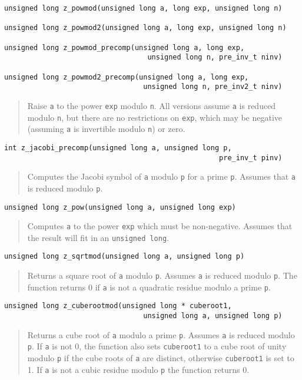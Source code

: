 \documentclass[a4paper,10pt]{article}
\newcommand{\code}{\lstinline}
\begin{document}
\begin{lstlisting}
unsigned long z_powmod(unsigned long a, long exp, unsigned long n)

unsigned long z_powmod2(unsigned long a, long exp, unsigned long n)

unsigned long z_powmod_precomp(unsigned long a, long exp, 
                                  unsigned long n, pre_inv_t ninv)
                                     
unsigned long z_powmod2_precomp(unsigned long a, long exp, 
                                 unsigned long n, pre_inv2_t ninv)
\end{lstlisting}
\begin{quote}
Raise \code{a} to the power \code{exp} modulo \code{n}. All versions assume \code{a} is reduced modulo \code{n}, but there are no restrictions on \code{exp}, which may be negative (assuming \code{a} is invertible modulo \code{n}) or zero. 
\end{quote}                              

\begin{lstlisting}
int z_jacobi_precomp(unsigned long a, unsigned long p, 
                                                   pre_inv_t pinv)
\end{lstlisting}
\begin{quote}
Computes the Jacobi symbol of \code{a} modulo \code{p} for a prime \code{p}. Assumes that \code{a} is reduced modulo \code{p}.
\end{quote}

\begin{lstlisting}
unsigned long z_pow(unsigned long a, unsigned long exp)
\end{lstlisting}
\begin{quote}
Computes \code{a} to the power \code{exp} which must be non-negative. Assumes that the result will fit in an \code{unsigned long}.
\end{quote}

\begin{lstlisting}
unsigned long z_sqrtmod(unsigned long a, unsigned long p)
\end{lstlisting}
\begin{quote}
Returns a square root of \code{a} modulo \code{p}. Assumes \code{a} is reduced modulo \code{p}. The function returns 0 if \code{a} is not a quadratic residue modulo a prime \code{p}.
\end{quote}

\begin{lstlisting}
unsigned long z_cuberootmod(unsigned long * cuberoot1, 
                                 unsigned long a, unsigned long p)
\end{lstlisting}
\begin{quote}
Returns a cube root of \code{a} modulo a prime \code{p}. Assumes \code{a} is reduced modulo \code{p}. If \code{a} is not 0, the function also sets \code{cuberoot1} to a cube root of unity modulo \code{p} if the cube roots of \code{a} are distinct, otherwise \code{cuberoot1} is set to 1. If \code{a} is not a cubic residue modulo \code{p} the function returns 0.
\end{quote}
\end{document}
